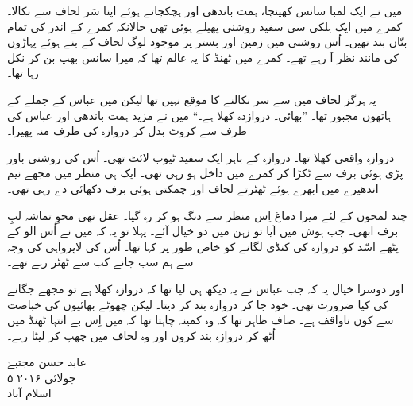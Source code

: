 \documentclass{article}
\begin{document}
میں نے ایک لمبا سانس کھینچا، ہمت باندھی اور ہچکچاتے ہوئے اپنا سَر لحاف سے نکالا۔ کمرے میں ایک ہلکی سی سفید روشنی پھیلے ہوئی تھی حالانکہ کمرے کے اندر کی تمام بتّاں بند تھیں۔ اُس روشنی میں زمین اور بستر پر موجود لوگ لحاف کے بنے ہوئے پہاڑوں کی مانند نظر آ رہے تھے۔ کمرے میں ٹھنڈ کا یہ عالم تھا کہ میرا سانس بھپ بن کر نکل رہا تھا۔

یہ ہرگز لحاف میں سے سر نکالنے کا موقع نہیں تھا لیکن میں عباس کے جملے کے ہاتھوں مجبور تھا۔ ''بھائی۔ دروازدہ کھلا ہے۔`` میں نے مزید ہمت باندھی اور عباس کی طرف سے کروٹ بدل کر دروازہ کی طرف منہ پھیرا۔

دروازہ واقعی کھلا تھا۔ دروازہ کے باہر ایک سفید ٹیوب لائٹ تھی۔ اُس کی روشنی باور پڑی ہوئی برف سے ٹکڑا کر کمرے میں داخل ہو رہی تھی۔ ایک ہی منظر میں مجھے نیم اندھیرے میں ابھرے ہوئے ٹھٹرتے لحاف اور چمکتی ہوئی برف دکھائی دے رہی تھی۔

چند لمحوں کے لئے میرا دماغ اِس منظر سے دنگ ہو کر رہ گیا۔ عقل تھی محوِ تماشہ لبِ برف ابھی۔ جب ہوش میں آیا تو زہن میں دو خیال آئے۔ پہلا تو یہ کہ میں نے اُس الو کے پٹھے اسّد کو دروازہ کی کنڈی لگانے کو خاص طور پر کہا تھا۔ اُس کی لاپرواہی کی وجہ سے ہم سب جانے کب سے ٹھٹر رہے تھے۔

اور دوسرا خیال یہ کہ جب عباس نے یہ دیکھ ہی لیا تھا کہ دروازہ کھلا ہے تو مجھے جگانے کی کیا ضرورت تھی۔ خود جا کر دروازہ بند کر دیتا۔ لیکن چھوٹے بھائیوں کی خباصت سے کون ناواقف ہے۔ صاف ظاہر تھا کہ وہ کمینہ چاہتا تھا کہ میں اِس بے انتہا ٹھنڈ میں اُٹھ کر دروازہ بند کروں اور وہ لحاف میں چھپ کر لیٹا رہے۔



\vspace{\baselineskip}
\begin{flushleft}
   عابد حسن مجتبےٰ\\
   ۵ جولائی ۲۰۱۶\\
   اسلام آباد
\end{flushleft}
\end{document}
